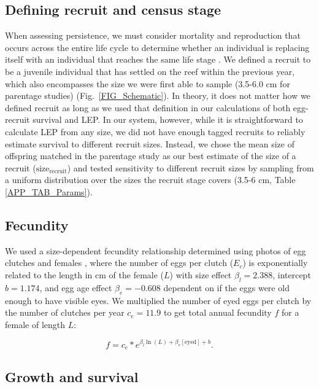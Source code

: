 \documentclass[12pt, oneside]{article}   	%
\begin{document}
\subsection{Defining recruit and census stage} \label{APP_SEC_METHODS_Recruit_def}

When assessing persistence, we must consider mortality and reproduction that occurs across the entire life cycle to determine whether an individual is replacing itself with an individual that reaches the same life stage \citep{burgess2014beyond}. We defined a recruit to be a juvenile individual that has settled on the reef within the previous year, which also encompasses the size we were first able to sample (3.5-6.0 cm for parentage studies) (Fig.\ \ref{FIG_Schematic}). In theory, it does not matter how we defined recruit as long as we used that definition in our calculations of both egg-recruit survival and LEP. In our system, however, while it is straightforward to calculate LEP from any size, we did not have enough tagged recruits to reliably estimate survival to different recruit sizes. Instead, we chose the mean size of offspring matched in the parentage study as our best estimate of the size of a recruit ($\text{size}_\text{recruit}$) and tested sensitivity to different recruit sizes by sampling from a uniform distribution over the sizes the recruit stage covers (3.5-6 cm, Table \ref{APP_TAB_Params}).

\subsection{Fecundity} \label{APP_SEC_METHODS_Fecundity}

We used a size-dependent fecundity relationship determined using photos of egg clutches and females \citep{yawdoszynInPrepfecundity}, where the number of eggs per clutch ($E_c$) is exponentially related to the length in cm of the female ($L$) with size effect $\beta_l = 2.388$, intercept $b = 1.174$, and egg age effect $\beta_e = -0.608$ dependent on if the eggs were old enough to have visible eyes. We multiplied the number of eyed eggs per clutch by the number of clutches per year $c_e = 11.9$ \citep[estimate from][]{holtswarth2017fecundity} to get total annual fecundity $f$ for a female of length $L$:

\begin{equation}
f = c_e * e^{\beta_l\ln(L) + \beta_e[\text{eyed}] + b}. \label{EQN_Fec}
\end{equation}

\subsection{Growth and survival} \label{APP_SEC_METHODS_Growth_and_survival}
\end{document}
